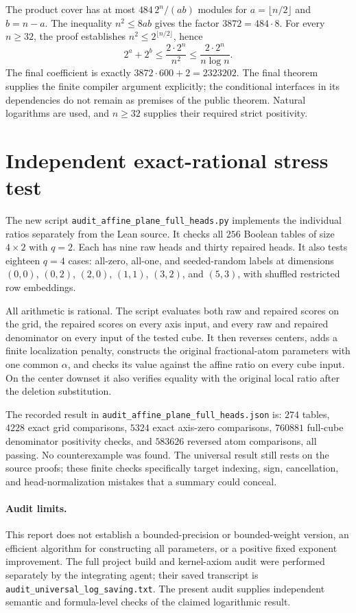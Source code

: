\documentclass[11pt]{article}
\begin{document}
The product cover has at most $484\,2^n/(ab)$ modules for
$a=\lfloor n/2\rfloor$ and $b=n-a$. The inequality
$n^2\leq8ab$ gives the factor $3872=484\cdot8$. For every $n\geq32$,
the proof establishes $n^2\leq2^{\lfloor n/2\rfloor}$, hence
\[
 2^a+2^b\leq\frac{2\cdot2^n}{n^2}
 \leq\frac{2\cdot2^n}{n\log n}.
\]
The final coefficient is exactly $3872\cdot600+2=2323202$.
The final theorem supplies the finite compiler argument explicitly;
the conditional interfaces in its dependencies do not remain as
premises of the public theorem. Natural logarithms are used, and
$n\geq32$ supplies their required strict positivity.

\section{Independent exact-rational stress test}
The new script \texttt{audit\_affine\_plane\_full\_heads.py}
implements the individual ratios separately from the Lean source.
It checks all $256$ Boolean tables of size $4\times2$ with $q=2$.
Each has nine raw heads and thirty repaired heads. It also tests
eighteen $q=4$ cases: all-zero, all-one, and seeded-random labels
at dimensions $(0,0)$, $(0,2)$, $(2,0)$, $(1,1)$, $(3,2)$, and
$(5,3)$, with shuffled restricted row embeddings.

All arithmetic is rational. The script evaluates both raw and repaired
scores on the grid, the repaired scores on every axis input, and
every raw and repaired denominator on every input of the tested cube.
It then reverses centers, adds a finite localization penalty, constructs
the original fractional-atom parameters with one common $\alpha$, and
checks its value against the affine ratio on every cube input. On
the center downset it also verifies equality with the original local
ratio after the deletion substitution.

The recorded result in \texttt{audit\_affine\_plane\_full\_heads.json}
is: $274$ tables, $4228$ exact grid comparisons, $5324$ exact axis-zero
comparisons, $760881$ full-cube denominator positivity checks, and
$583626$ reversed atom comparisons, all passing. No counterexample
was found. The universal result still rests on the source proofs;
these finite checks specifically target indexing, sign, cancellation,
and head-normalization mistakes that a summary could conceal.

\paragraph{Audit limits.}
This report does not establish a bounded-precision or bounded-weight
version, an efficient algorithm for constructing all parameters, or
a positive fixed exponent improvement. The full project build and
kernel-axiom audit were performed separately by the integrating agent;
their saved transcript is \texttt{audit\_universal\_log\_saving.txt}.
The present audit supplies independent semantic and formula-level
checks of the claimed logarithmic result.
\end{document}
